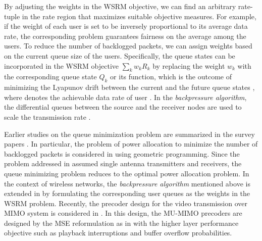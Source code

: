 By adjusting the weights in the \ac{WSRM} objective, we can find an arbitrary rate-tuple in the rate region that maximizes suitable objective measures. For example, if the weight of each user is set to be inversely proportional to its average data rate, the corresponding problem guarantees fairness on the average among the users. To reduce the number of backlogged packets, we can assign weights based on the current queue size of the users. Specifically, the queue states can be incorporated in the \ac{WSRM} objective $\sum_k w_k R_k$ by replacing the weight $w_k$ with the corresponding queue state $Q_k$ or its function, which is the outcome of minimizing the Lyapunov drift between the current and the future queue states \cite{tassiulas,neely2010stochastic}, where  denotes the achievable data rate of user . In the \textit{backpressure algorithm}, the differential queues between the source and the receiver nodes are used to scale the transmission rate \cite{georgiadis2006resource}.

Earlier studies on the queue minimization problem are summarized in the survey papers \cite{berry2004cross,layering_as_opt}. In particular, the problem of power allocation to minimize the number of backlogged packets is considered in \cite{qps_cioffi} using geometric programming. Since the problem addressed in \cite{qps_cioffi} assumed single antenna transmitters and receivers, the queue minimizing problem reduces to the optimal power allocation problem. In the context of wireless networks, the \textit{backpressure algorithm} mentioned above is extended in \cite{weeraddana2011resource} by formulating the corresponding user queues as the weights in the \ac{WSRM} problem. Recently, the precoder design for the video transmission over \ac{MIMO} system is considered in \cite{video_queues}. In this design, the \ac{MU}-\ac{MIMO} precoders are designed by the \ac{MSE} reformulation as in \cite{christensen2008weighted} with the higher layer performance objective such as playback interruptions and buffer overflow probabilities.

